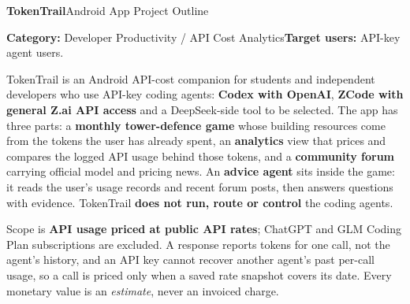 \documentclass[10pt,a4paper]{article}
\newcommand{\sect}[1]{\vspace{3pt}{\large\bfseries#1}\par\vspace{1pt}}
\begin{document}
\color{black}

{\fontsize{22}{26}\selectfont\bfseries TokenTrail}\hfill{\normalsize Android App Project Outline}\par
{}\vspace{4pt}
\textbf{Category:} Developer Productivity / API Cost Analytics\hfill\textbf{Target users:} API-key agent users.

\sect{1. App idea and user problem}
TokenTrail is an Android API-cost companion for students and independent developers who use API-key coding agents: \textbf{Codex with OpenAI}, \textbf{ZCode with general Z.ai API access} and a DeepSeek-side tool to be selected. The app has three parts: a \textbf{monthly tower-defence game} whose building resources come from the tokens the user has already spent, an \textbf{analytics} view that prices and compares the logged API usage behind those tokens, and a \textbf{community forum} carrying official model and pricing news. An \textbf{advice agent} sits inside the game: it reads the user's usage records and recent forum posts, then answers questions with evidence. TokenTrail \textbf{does not run, route or control} the coding agents.

Scope is \textbf{API usage priced at public API rates}; ChatGPT and GLM Coding Plan subscriptions are excluded. A response reports tokens for one call, not the agent's history, and an API key cannot recover another agent's past per-call usage, so a call is priced only when a saved rate snapshot covers its date. Every monetary value is an \emph{estimate}, never an invoiced charge.
\end{document}
